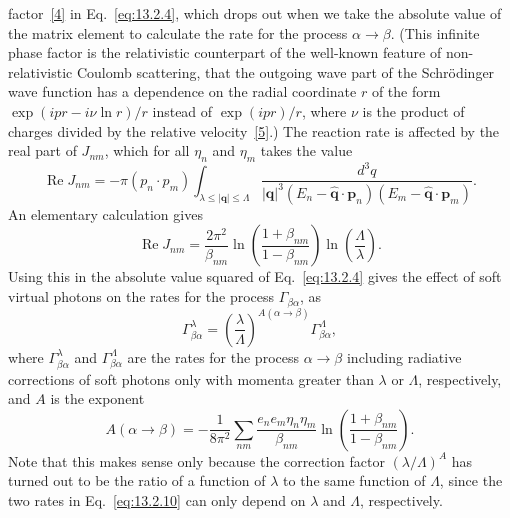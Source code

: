 factor~\hyperref[ref:13.4]{[4]} in Eq.~\eqref{eq:13.2.4}, which drops out when we take the absolute value of
the matrix element to calculate the rate for the process $\alpha\to\beta$. (This infinite
phase factor is the relativistic counterpart of the well-known feature of
non-relativistic Coulomb scattering, that the outgoing wave part of the
Schrödinger wave function has a dependence on the radial coordinate $r$ of
the form $\exp(ipr-i\nu\ln r)/r$ instead of $\exp(ipr)/r$, where $\nu$ is the product
of charges divided by the relative velocity~\hyperref[ref:13.5]{[5]}.) The reaction rate is affected
by the real part of $J_{nm}$, which for all $\eta_n$ and $\eta_m$ takes the value
\begin{equation}
  \operatorname{Re}J_{nm}=-\pi(p_n\cdot p_m)
  \int_{\lambda\leq|\mathbf q|\leq\Lambda}
  \frac{d^3q}{|\mathbf q|^3
  (E_n-\hat{\mathbf q}\cdot\mathbf p_n)(E_m-\hat{\mathbf q}\cdot\mathbf p_m)}.
  \tag{13.2.8}\label{eq:13.2.8}
\end{equation}
An elementary calculation gives
\begin{equation}
  \operatorname{Re}J_{nm}=\frac{2\pi^2}{\beta_{nm}}
  \ln\left(\frac{1+\beta_{nm}}{1-\beta_{nm}}\right)
  \ln\left(\frac{\Lambda}{\lambda}\right).
  \tag{13.2.9}\label{eq:13.2.9}
\end{equation}
Using this in the absolute value squared of Eq.~\eqref{eq:13.2.4} gives the effect of
soft virtual photons on the rates for the process $\Gamma_{\beta\alpha}$, as
\begin{equation}
  \Gamma^\lambda_{\beta\alpha}=\left(\frac{\lambda}{\Lambda}\right)^{A(\alpha\to\beta)}
  \Gamma^\Lambda_{\beta\alpha},
  \tag{13.2.10}\label{eq:13.2.10}
\end{equation}
where $\Gamma^\lambda_{\beta\alpha}$ and $\Gamma^\Lambda_{\beta\alpha}$ are the rates for the process $\alpha\to\beta$ including radiative
corrections of soft photons only with momenta greater than $\lambda$ or $\Lambda$,
respectively, and $A$ is the exponent
\begin{equation}
  A(\alpha\to\beta)=-\frac{1}{8\pi^2}\sum_{nm}
  \frac{e_n e_m\eta_n\eta_m}{\beta_{nm}}
  \ln\left(\frac{1+\beta_{nm}}{1-\beta_{nm}}\right).
  \tag{13.2.11}\label{eq:13.2.11}
\end{equation}
Note that this makes sense only because the correction factor $(\lambda/\Lambda)^A$
has turned out to be the ratio of a function of $\lambda$ to the same function
of $\Lambda$, since the two rates in Eq.~\eqref{eq:13.2.10} can only depend on $\lambda$ and $\Lambda$,
respectively.

